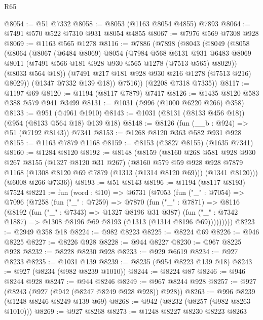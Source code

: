 \begin{lexlean}{R65}
\begin{coremodule}
@8054 := @51 @7332
@8058 := @8053 (@1163 @8054 @4855) @7893
@8064 := @7491 @570 @522 @7310 @931 @8054 @4855
@8067 := @7976 @569 @7308 @928
@8069 := @1163 @565 @1278
@8116 := @7886
    (@7898
      (@8043
        (@8049
          (@8058
            (@8064
              (@8067
                (@6484 @8069)
                @8054
                (@7984
                  @568
                  @6131
                  @931
                  @6483
                  @8069
                  @8011
                  (@7491 @566 @181 @928 @930 @565 @1278 (@7513 @565) @8029))
                (@8033 @564 @18))
              (@7491 @217 @181 @928 @930 @216 @1278 (@7513 @216) @8029))
            (@1347 @7332 @139 @18))
          @7516))
      (@2208 @7318 @7335))
@8117 := @1197 @69
@8120 := @1194 (@8117 @7879) @7417
@8126 := @1435 @8120 @583 @388 @579 @941 @3499
@8131 := @1031 (@996 (@1000 @6220 @266) @358)
@8133 := @951 (@4961 @1910)
@8143 := @1031 (@8131 (@8133 @456 @18)) (@954 (@8133 @564 @18) @139 @18)
@8148 := @8126 (fun (__b : @924) => @51 (@7192 @8143)) @7341
@8153 := @1268 @8120 @363 @582 @931 @928
@8155 := @1163 @7879 @1168
@8159 := @8153 (@3827 @8155) (@1635 @7341)
@8160 := @1284 @8120
@8192 := @8148
    (@8159
      (@8160
        @268
        @581
        @928
        @930
        @267
        @8155
        (@1327 @8120 @31 @267)
        (@8160
          @579
          @59
          @928
          @928
          @7879
          @1168
          (@1308 @8120 @69 @7879 (@1313 (@1314 @8120 @69)))
          (@1341 @8120)))
      (@6008 @266 @7336))
@8193 := @51 @8143
@8196 := @1194 (@8117 @8193) @7524
@8221 := fun (word : @10) =>
  @6731
    (@7053
      (fun ("_" : @7054) =>
      @7096
        (@7258
          (fun ("_" : @7259) =>
          @7870
            (fun ("_" : @7871) =>
            @8116
              (@8192
                (fun ("_" : @7343) => @1327 @8196 @31 @387)
                (fun ("_" : @7342 @1887) => @1308 @8196 @69 @8193 (@1313 (@1314 @8196 @69)))))))))
@8223 := @2949 @358 @18
@8224 := @982 @8223
@8225 := @8224 @69
@8226 := @946 @8225
@8227 := @8226 @928
@8228 := @944 @8227
@8230 := @967 @8225 @928
@8232 := @8228 @8230 @928
@8233 := @929 @6619
@8234 := @927 @8233
@8235 := @1031 @139
@8239 := @8235 (@954 @8223 @139 @18)
@8243 := @927 (@8234 (@982 @8239 @1010))
@8244 := @8224 @87
@8246 := @946 @8244 @928
@8247 := @944 @8246
@8249 := @967 @8244 @928
@8257 := @927 (@8243 (@927 (@942 (@8247 @8249 @928 @928)) @928))
@8263 := @996 @8239 (@1248 @8246 @8249 @139 @69)
@8268 := @942 (@8232 (@8257 (@982 @8263 @1010)))
@8269 := @927 @8268
@8273 := @1248 @8227 @8230 @8223 @8263

\end{coremodule}
\end{lexlean}
